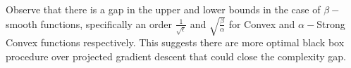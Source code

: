 Observe that there is a gap in the upper and lower bounds in the case of $\beta-$smooth functions, specifically an order $\frac{1}{\sqrt{\epsilon}}$ and $\sqrt{\frac{\beta}{\alpha}}$ for Convex and $\alpha-$Strong Convex functions respectively. This suggests there are more optimal black box procedure over projected gradient descent that could close the complexity gap.
